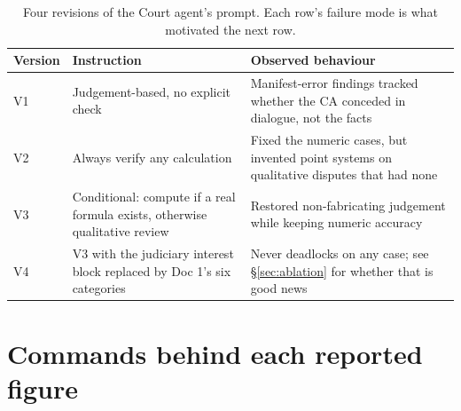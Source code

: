 \begin{table}[htbp]
\centering
\footnotesize
\setlength{\tabcolsep}{4pt}
\renewcommand{\arraystretch}{1.25}
\caption[Court prompt revisions]{Four revisions of the Court agent's prompt. Each
row's failure mode is what motivated the next row.}
\label{tab:court-versions}
\begin{tabularx}{\textwidth}{@{}p{1.3cm}>{\raggedright\arraybackslash}p{3.9cm}X@{}}
\toprule
\textbf{Version} & \textbf{Instruction} & \textbf{Observed behaviour} \\
\midrule
V1 & Judgement-based, no explicit check &
 Manifest-error findings tracked whether the CA conceded in dialogue, not the
 facts \\
V2 & Always verify any calculation &
 Fixed the numeric cases, but invented point systems on qualitative disputes
 that had none \\
V3 & Conditional: compute if a real formula exists, otherwise qualitative
 review &
 Restored non-fabricating judgement while keeping numeric accuracy \\
V4 & V3 with the judiciary interest block replaced by Doc 1's six categories &
 Never deadlocks on any case; see \S\ref{sec:ablation} for whether that is
 good news \\
\bottomrule
\end{tabularx}
\end{table}

\section{Commands behind each reported figure}

